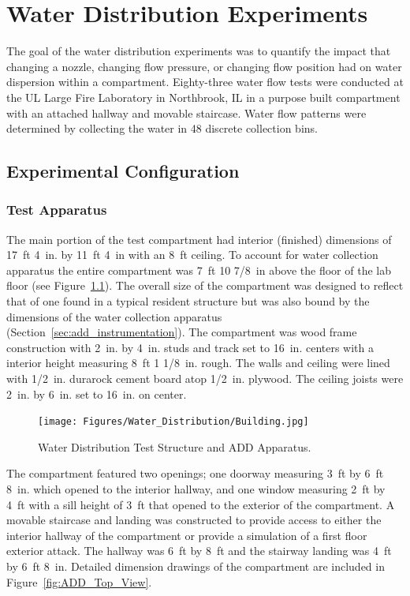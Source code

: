 \documentclass[12pt,oneside]{book}
\begin{document}
\chapter{Water Distribution Experiments}

The goal of the water distribution experiments was to quantify the impact that changing a nozzle, changing flow pressure, or changing flow position had on water dispersion within a compartment. Eighty-three water flow tests were conducted at the UL Large Fire Laboratory in Northbrook, IL in a purpose built compartment with an attached hallway and movable staircase. Water flow patterns were determined by collecting the water in 48 discrete collection bins.

\section{Experimental Configuration}

\subsection{Test Apparatus}
\label{ADD_discussion}
The main portion of the test compartment had interior (finished) dimensions of 17~ft 4~in. by 11~ft 4~in with an 8~ft ceiling. To account for water collection apparatus the entire compartment was 7~ft 10 7/8~in above the floor of the lab floor (see Figure~\ref{fig:Water_Distribution_Test_Structure_and_ADD_Apparatus}). The overall size of the compartment was designed to reflect that of one found in a typical resident structure but was also bound by the dimensions of the water collection apparatus (Section~\ref{sec:add_instrumentation}). The compartment was wood frame construction with 2~in. by 4~in. studs and track set to 16~in. centers with a interior height measuring 8~ft 1 1/8~in. rough. The walls and ceiling were lined with 1/2~in. durarock cement board atop 1/2~in. plywood. The ceiling joists were 2~in. by 6~in. set to 16~in. on center.

\begin{figure}[!ht]
	\centering
	\texttt{[image: Figures/Water\_Distribution/Building.jpg]}
	\caption[Water Distribution Test Structure and ADD Apparatus]{Water Distribution Test Structure and ADD Apparatus.}
	\label{fig:Water_Distribution_Test_Structure_and_ADD_Apparatus}
\end{figure}

The compartment featured two openings; one doorway measuring 3~ft by 6~ft 8~in. which opened to the interior hallway, and one window measuring 2~ft by 4~ft with a sill height of 3~ft that opened to the exterior of the compartment. A movable staircase and landing was constructed to provide access to either the interior hallway of the compartment or provide a simulation of a first floor exterior attack. The hallway was 6~ft by 8~ft and the stairway landing was 4~ft by 6~ft 8~in. Detailed dimension drawings of the compartment are included in Figure~\ref{fig:ADD_Top_View}.
\end{document}
